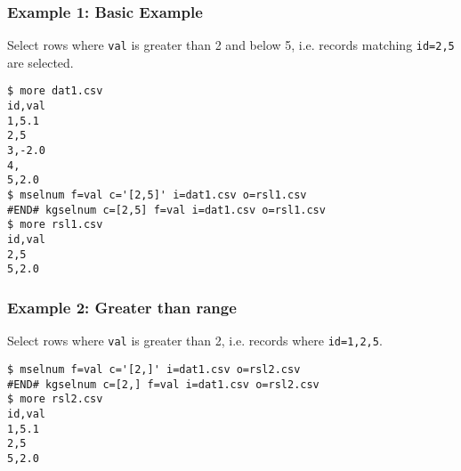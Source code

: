 \subsubsection*{Example 1: Basic Example}

Select rows where \verb|val| is greater than 2 and below 5, i.e. records matching \verb|id=2,5| are selected.


\begin{Verbatim}[baselinestretch=0.7,frame=single]
$ more dat1.csv
id,val
1,5.1
2,5
3,-2.0
4,
5,2.0
$ mselnum f=val c='[2,5]' i=dat1.csv o=rsl1.csv
#END# kgselnum c=[2,5] f=val i=dat1.csv o=rsl1.csv
$ more rsl1.csv
id,val
2,5
5,2.0
\end{Verbatim}
\subsubsection*{Example 2: Greater than range}

Select rows where \verb|val| is greater than 2, i.e. records where \verb|id=1,2,5|.


\begin{Verbatim}[baselinestretch=0.7,frame=single]
$ mselnum f=val c='[2,]' i=dat1.csv o=rsl2.csv
#END# kgselnum c=[2,] f=val i=dat1.csv o=rsl2.csv
$ more rsl2.csv
id,val
1,5.1
2,5
5,2.0
\end{Verbatim}
